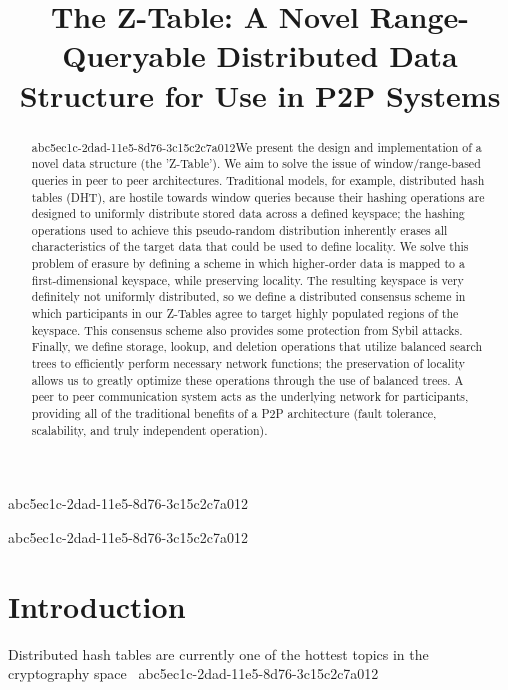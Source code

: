 \documentclass[12pt]{article}
\title{The Z-Table: A Novel Range-Queryable Distributed Data Structure for Use in P2P Systems}
\begin{document}
\maketitle

\begin{abstract}
abc5ec1c-2dad-11e5-8d76-3c15c2c7a012We present the design and implementation of a novel data structure (the 'Z-Table'). We aim to solve the issue of window/range-based queries in peer to peer architectures. Traditional models, for example,  distributed hash tables (DHT), are hostile towards window queries because their hashing operations are designed to uniformly distribute stored data across a defined keyspace; the hashing operations used to achieve this pseudo-random distribution inherently erases all characteristics of the target data that could be used to define locality. We solve this problem of erasure by defining a scheme in which higher-order data is mapped to a first-dimensional keyspace, while preserving locality. The resulting keyspace is very definitely not uniformly distributed, so we define a distributed consensus scheme in which participants in our Z-Tables agree to target highly populated regions of the keyspace. This consensus scheme also provides some protection from Sybil attacks. Finally, we define storage, lookup, and deletion operations that utilize balanced search trees to efficiently perform necessary network functions; the preservation of locality allows us to greatly optimize these operations through the use of balanced trees. A peer to peer communication system acts as the underlying network for participants, providing all of the traditional benefits of a P2P architecture (fault tolerance, scalability, and truly independent operation).
\end{abstract}
abc5ec1c-2dad-11e5-8d76-3c15c2c7a012

\newpage
abc5ec1c-2dad-11e5-8d76-3c15c2c7a012\section{Introduction}
Distributed hash tables are currently one of the hottest topics in the cryptography space~\cite{Stoica:2001dj,Rowstron:2001ea,Ratnasamy:2001wn}
abc5ec1c-2dad-11e5-8d76-3c15c2c7a012
\printbibliography
\end{document}
